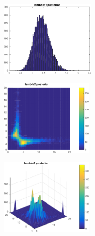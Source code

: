 \documentclass{article}
\begin{document}
\begin{figure}
\centering
\begin{subfigure}{0.3 \textwidth}
\centering
\includegraphics[height=1.5in]{lambda_11}
\caption{}
\end{subfigure}
\begin{subfigure}{0.3 \textwidth}
\centering
\includegraphics[height=1.5in]{lambda_22}
\caption{}
\end{subfigure}
\begin{subfigure}{0.3 \textwidth}
\centering
\includegraphics[height=1.5in]{lambda_22_3d}
\caption{}
\end{subfigure}
\caption{}
\label{fig:posteriors}
\end{figure}
\end{document}
